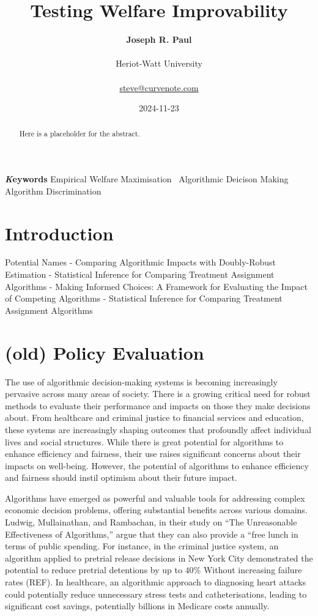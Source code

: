 \documentclass[
]{article}
\title{Testing Welfare Improvability}
\author{\textbf{Joseph R. Paul}\\\\Heriot-Watt
University\\\\\href{mailto:steve@curvenote.com}{steve@curvenote.com}}
\date{2024-11-23}
\begin{document}
\maketitle
\begin{abstract}
Here is a placeholder for the abstract.
\end{abstract}
{\bfseries \emph Keywords}
\def\sep{\textbullet\ }
Empirical Welfare Maximisation \sep Algorithmic Deicison Making \sep 
Algorithm Discrimination



\section{Introduction}\label{introduction}

Potential Names - Comparing Algorithmic Impacts with Doubly-Robust
Estimation - Statistical Inference for Comparing Treatment Assignment
Algorithms - Making Informed Choices: A Framework for Evaluating the
Impact of Competing Algorithms - Statistical Inference for Comparing
Treatment Assignment Algorithms

\section{(old) Policy Evaluation}\label{old-policy-evaluation}

The use of algorithmic decision-making systems is becoming increasingly
pervasive across many areas of society. There is a growing critical need
for robust methods to evaluate their performance and impacts on those
they make decisions about. From healthcare and criminal justice to
financial services and education, these systems are increasingly shaping
outcomes that profoundly affect individual lives and social structures.
While there is great potential for algorithms to enhance efficiency and
fairness, their use raises significant concerns about their impacts on
well-being. However, the potential of algorithms to enhance efficiency
and fairness should instil optimism about their future impact.

Algorithms have emerged as powerful and valuable tools for addressing
complex economic decision problems, offering substantial benefits across
various domains. Ludwig, Mullainathan, and Rambachan, in their study on
``The Unreasonable Effectiveness of Algorithms,'' argue that they can
also provide a ``free lunch in terms of public spending. For instance,
in the criminal justice system, an algorithm applied to pretrial release
decisions in New York City demonstrated the potential to reduce pretrial
detentions by up to \(40\%\) Without increasing failure rates (REF). In
healthcare, an algorithmic approach to diagnosing heart attacks could
potentially reduce unnecessary stress tests and catheterisations,
leading to significant cost savings, potentially billions in Medicare
costs annually.
\end{document}
